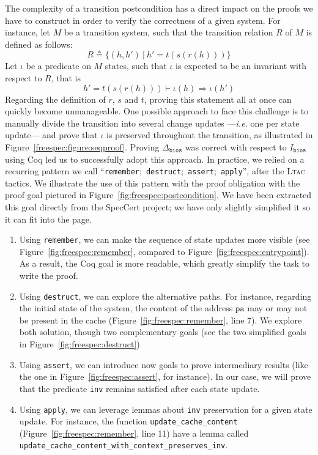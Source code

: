 \documentclass[oneside,a4paper]{memoir}
\theoremstyle{break}
\begin{document}
The complexity of a transition postcondition has a direct impact on the proofs
we have to construct in order to verify the correctness of a given system.
%
For instance, let \( M \) be a transition system, such that the transition
relation \( R \) of \( M \) is defined as follows:
%
\[
  R \triangleq \{ (h, h')\ |\ h' = t(s(r(h))) \}
\]
%
Let \( \iota \) be a predicate on \( M \) states, such that \( \iota \) is
expected to be an invariant with respect to \( R \), that is
%
\[
  h' = t(s(r(h))) \vdash \iota(h) \Rightarrow \iota(h')
\]
%
Regarding the definition of \( r \), \( s \) and \( t \), proving this statement
all at once can quickly become unmanageable.
%
One possible approach to face this challenge is to manually divide the
transition into several change updates ---\emph{i.e.} one per state update---
and prove that \( \iota \) is preserved throughout the transition, as
illustrated in Figure~\ref{freespec:figure:seqproof}.
%
Proving \( \Delta_{\mathtt{bios}} \) was correct with respect to
\( I_{\mathtt{bios}} \) using Coq led us to successfully adopt this approach.
%
In practice, we relied on a recurring pattern we call
``\texttt{remember};~\texttt{destruct};~\texttt{assert};~\texttt{apply}'', after
the {\scshape Ltac} tactics.
%
We illustrate the use of this pattern with the proof obligation with the proof
goal pictured in Figure~\ref{fig:freespec:postcondition}.
%
We have been extracted this goal directly from the SpecCert project; we have
only slightly simplified it so it can fit into the page.
%
\begin{enumerate}
\item Using \texttt{remember}, we can make the sequence of state updates more
  visible (see Figure~\ref{fig:freespec:remember}, compared to
  Figure~\ref{fig:freespec:entrypoint}).
  As a result, the Coq goal is more readable, which greatly simplify the task to
  write the proof.
\item Using \texttt{destruct}, we can explore the alternative paths.
  For instance, regarding the initial state of the system, the content of the
  address \( \mathtt{pa} \) may or may not be present in the cache
  (Figure~\ref{fig:freespec:remember}, line 7).
  We explore both solution, though two complementary goals (see the two
  simplified goals in Figure~\ref{fig:freespec:destruct})
\item Using \texttt{assert}, we can introduce now goals to prove intermediary
  results (like the one in Figure~\ref{fig:freespec:assert}, for instance).
  In our case, we will prove that the predicate \texttt{inv} remains satisfied
  after each state update.
\item Using \texttt{apply}, we can leverage lemmas about \texttt{inv}
  preservation for a given state update.
  For instance, the function \texttt{update\_cache\_content}
  (Figure~\ref{fig:freespec:remember}, line 11) have a lemma called
  \texttt{update\_cache\_content\_with\_context\_preserves\_inv}.
\end{enumerate}
\end{document}
